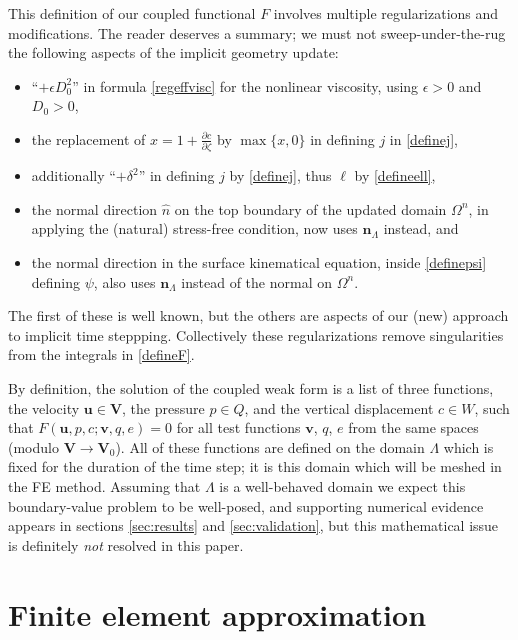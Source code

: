 \documentclass[letterpaper,final,12pt,reqno]{amsart}
\newcommand{\eps}{\epsilon}
\newcommand{\bn}{\mathbf{n}}
\newcommand{\bu}{\mathbf{u}}
\newcommand{\bv}{\mathbf{v}}
\newcommand{\bV}{\mathbf{V}}
\begin{document}
This definition of our coupled functional $F$ involves multiple regularizations and modifications.  The reader deserves a summary; we must not sweep-under-the-rug the following aspects of the implicit geometry update:
\begin{itemize}
\item ``$+\eps D_0^2$'' in formula \eqref{regeffvisc} for the nonlinear viscosity, using $\eps>0$ and $D_0>0$,
\item the replacement of $x=1+\frac{\partial c}{\partial \zeta}$ by $\max\{x,0\}$ in defining $j$ in \eqref{definej},
\item additionally ``$+\delta^2$'' in defining $j$ by \eqref{definej}, thus $\ell$ by \eqref{defineell},
\item the normal direction $\hat n$ on the top boundary of the updated domain $\Omega^n$, in applying the (natural) stress-free condition, now uses $\bn_\Lambda$ instead, and
\item the normal direction in the surface kinematical equation, inside \eqref{definepsi} defining $\psi$, also uses $\bn_\Lambda$ instead of the normal on $\Omega^n$.
\end{itemize}
The first of these is well known, but the others are aspects of our (new) approach to implicit time steppping.  Collectively these regularizations remove singularities from the integrals in \eqref{defineF}.

By definition, the solution of the coupled weak form is a list of three functions, the velocity $\bu \in \bV$, the pressure $p\in Q$, and the vertical displacement $c\in W$, such that $F(\bu,p,c;\bv,q,e) = 0$ for all test functions $\bv$, $q$, $e$ from the same spaces (modulo $\bV\to\bV_0$).  All of these functions are defined on the domain $\Lambda$ which is fixed for the duration of the time step; it is this domain which will be meshed in the FE method.  Assuming that $\Lambda$ is a well-behaved domain we expect this boundary-value problem to be well-posed, and supporting numerical evidence appears in sections \ref{sec:results} and \ref{sec:validation}, but this mathematical issue is definitely \emph{not} resolved in this paper.



\section{Finite element approximation}  \label{sec:finiteelement}
\end{document}
